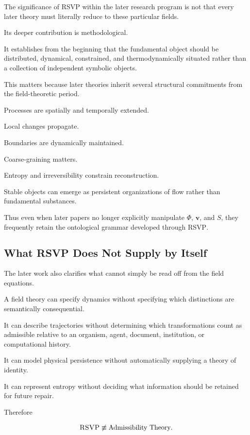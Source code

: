 \documentclass[11pt]{article}
\theoremstyle{remark}
\newcommand{\RSVP}{\textsc{RSVP}}
\begin{document}
The significance of \RSVP{} within the later research program is not that every later theory must literally reduce to these particular fields.

Its deeper contribution is methodological.

It establishes from the beginning that the fundamental object should be distributed, dynamical, constrained, and thermodynamically situated rather than a collection of independent symbolic objects.

This matters because later theories inherit several structural commitments from the field-theoretic period.

Processes are spatially and temporally extended.

Local changes propagate.

Boundaries are dynamically maintained.

Coarse-graining matters.

Entropy and irreversibility constrain reconstruction.

Stable objects can emerge as persistent organizations of flow rather than fundamental substances.

Thus even when later papers no longer explicitly manipulate $\Phi$, $\mathbf{v}$, and $S$, they frequently retain the ontological grammar developed through \RSVP{}.

\subsection{What \RSVP{} Does Not Supply by Itself}

The later work also clarifies what cannot simply be read off from the field equations.

A field theory can specify dynamics without specifying which distinctions are semantically consequential.

It can describe trajectories without determining which transformations count as admissible relative to an organism, agent, document, institution, or computational history.

It can model physical persistence without automatically supplying a theory of identity.

It can represent entropy without deciding what information should be retained for future repair.

Therefore

\begin{equation}
\RSVP{}
\not\equiv
\text{Admissibility Theory}.
\end{equation}
\end{document}
